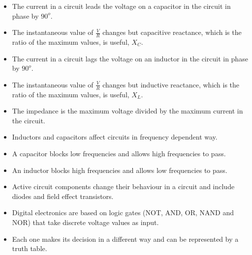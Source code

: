 \begin{itemize}
\item The current in a circuit leads the voltage on a capacitor in the circuit in phase by $90^o$.
\item The instantaneous value of $\frac{V}{R}$ changes but capacitive reactance, which is the ratio of the maximum values, is useful, $X_{C}$.
\item The current in a circuit lags the voltage on an inductor  in the circuit in phase by $90^o$.
\item The instantaneous value of $\frac{V}{R}$ changes but inductive reactance, which is the ratio of the maximum values, is useful, $X_{L}$.
\item The impedance is the maximum voltage divided by the maximum current in the circuit.
\item Inductors and capacitors affect circuits in frequency dependent way.
\item A capacitor blocks low frequencies and allows high frequencies to pass.
\item An inductor blocks high frequencies and allows low frequencies to pass.
\item Active circuit components change their behaviour in a circuit and include diodes and field effect transistors.
\item Digital electronics are based on logic gates (NOT, AND, OR, NAND and NOR) that take discrete voltage values as input. 
\item Each one makes its decision in a different way and can be represented by a truth table.
\end{itemize}


